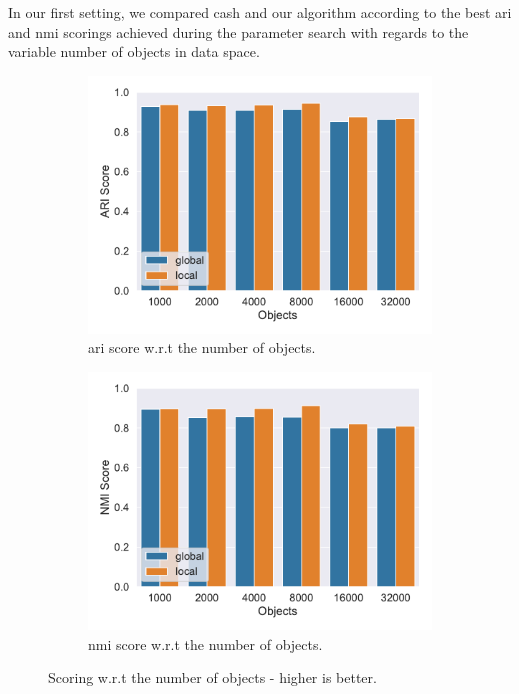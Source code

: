 In our first setting, we compared \gls{cash} and our algorithm according to the best \gls{ari} and \gls{nmi} scorings achieved during the parameter search with regards to the variable number of objects in data space. 
\begin{figure}[h]
    \centering
    \begin{subfigure}[t]{.5\textwidth}
      \centering  
      \captionsetup{width=.9\linewidth}
      \includegraphics[width=\textwidth]{new_evaluation/per_objects/Best_ARI_3D_N5_pobjects_bar.pdf}
      \caption{\gls{ari} score w.r.t the number of objects.}
      \label{fig:ariperpts}
    \end{subfigure}%
    \begin{subfigure}[t]{.5\textwidth}
      \centering
      \captionsetup{width=.9\linewidth}
      \includegraphics[width=\textwidth]{new_evaluation/per_objects/Best_NMI_3D_N5_pobjects_bar.pdf}
      \caption{\gls{nmi} score w.r.t the number of objects.}
      \label{fig:nmiperpts}
    \end{subfigure}
    \caption{Scoring w.r.t the number of objects - higher is better.}
    \label{fig:scoreperpts}
\end{figure}

